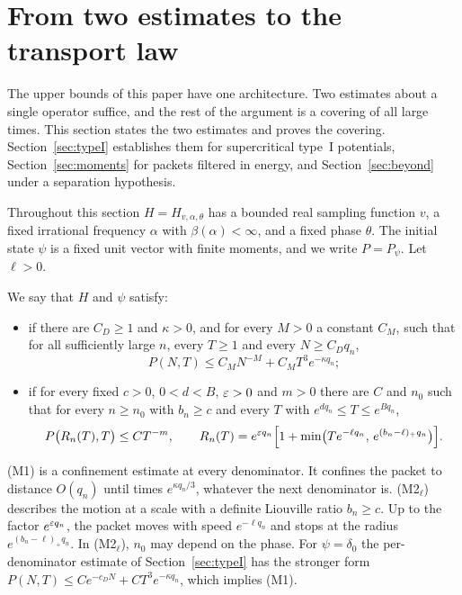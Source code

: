 \section{From two estimates to the transport law}\label{sec:covering}

The upper bounds of this paper have one architecture. Two estimates about a single operator suffice, and the rest of the argument is a covering of all large times. This section states the two estimates and proves the covering. Section~\ref{sec:typeI} establishes them for supercritical type~I potentials, Section~\ref{sec:moments} for packets filtered in energy, and Section~\ref{sec:beyond} under a separation hypothesis.

Throughout this section $H=H_{v,\alpha,\theta}$ has a bounded real sampling function $v$, a fixed irrational frequency $\alpha$ with $\beta(\alpha)<\infty$, and a fixed phase $\theta$. The initial state $\psi$ is a fixed unit vector with finite moments, and we write $P=P_\psi$. Let $\ell>0$.

\begin{definition}\label{def:M}
We say that $H$ and $\psi$ satisfy:
\begin{itemize}
\item[(M1)] if there are $C_D\ge1$ and $\kappa>0$, and for every $M>0$ a constant $C_M$, such that for all sufficiently large $n$, every $T\ge1$ and every $N\ge C_Dq_n$,
\[
P(N,T)\le C_MN^{-M}+C_MT^3e^{-\kappa q_n};
\]
\item[(M2$_\ell$)] if for every fixed $c>0$, $0<d<B$, $\varepsilon>0$ and $m>0$ there are $C$ and $n_0$ such that for every $n\ge n_0$ with $b_n\ge c$ and every $T$ with $e^{dq_n}\le T\le e^{Bq_n}$,
\[
P\bigl(R_n(T),T\bigr)\le CT^{-m},\qquad R_n(T)=e^{\varepsilon q_n}\Bigl[1+\min\bigl(Te^{-\ell q_n},\,e^{(b_n-\ell)_+q_n}\bigr)\Bigr].
\]
\end{itemize}
\end{definition}

(M1) is a confinement estimate at every denominator. It confines the packet to distance $O(q_n)$ until times $e^{\kappa q_n/3}$, whatever the next denominator is. (M2$_\ell$) describes the motion at a scale with a definite Liouville ratio $b_n\ge c$. Up to the factor $e^{\varepsilon q_n}$, the packet moves with speed $e^{-\ell q_n}$ and stops at the radius $e^{(b_n-\ell)_+q_n}$. In (M2$_\ell$), $n_0$ may depend on the phase. For $\psi=\delta_0$ the per-denominator estimate of Section~\ref{sec:typeI} has the stronger form $P(N,T)\le Ce^{-c_DN}+CT^3e^{-\kappa q_n}$, which implies (M1).

